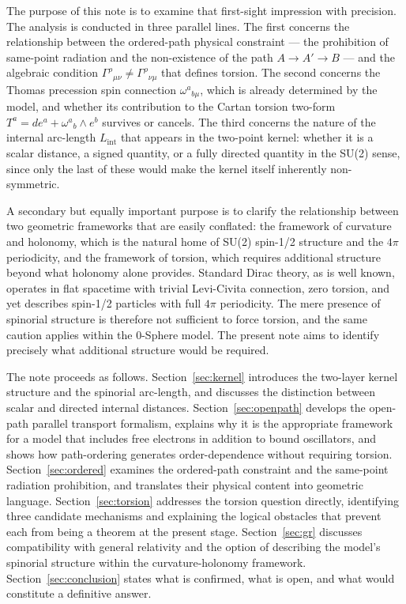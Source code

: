 \documentclass[%
 reprint,
 amsmath,amssymb,
 aps,
 prb,
]{revtex4-2}
\numberwithin{equation}{section}
\newcommand{\Lint}{L_{\text{int}}}
\begin{document}
The purpose of this note is to examine that first-sight impression with precision. The analysis is conducted in three parallel lines. The first concerns the relationship between the ordered-path physical constraint --- the prohibition of same-point radiation and the non-existence of the path $A\to A'\to B$ --- and the algebraic condition $\Gamma^\rho{}_{\mu\nu} \neq \Gamma^\rho{}_{\nu\mu}$ that defines torsion. The second concerns the Thomas precession spin connection $\omega^a{}_{b\mu}$, which is already determined by the model, and whether its contribution to the Cartan torsion two-form $T^a = de^a + \omega^a{}_b \wedge e^b$ survives or cancels. The third concerns the nature of the internal arc-length $\Lint$ that appears in the two-point kernel: whether it is a scalar distance, a signed quantity, or a fully directed quantity in the SU(2) sense, since only the last of these would make the kernel itself inherently non-symmetric.

A secondary but equally important purpose is to clarify the relationship between two geometric frameworks that are easily conflated: the framework of curvature and holonomy, which is the natural home of SU(2) spin-1/2 structure and the $4\pi$ periodicity, and the framework of torsion, which requires additional structure beyond what holonomy alone provides. Standard Dirac theory, as is well known, operates in flat spacetime with trivial Levi-Civita connection, zero torsion, and yet describes spin-1/2 particles with full $4\pi$ periodicity. The mere presence of spinorial structure is therefore not sufficient to force torsion, and the same caution applies within the 0-Sphere model. The present note aims to identify precisely what additional structure would be required.

The note proceeds as follows. Section~\ref{sec:kernel} introduces the two-layer kernel structure and the spinorial arc-length, and discusses the distinction between scalar and directed internal distances. Section~\ref{sec:openpath} develops the open-path parallel transport formalism, explains why it is the appropriate framework for a model that includes free electrons in addition to bound oscillators, and shows how path-ordering generates order-dependence without requiring torsion. Section~\ref{sec:ordered} examines the ordered-path constraint and the same-point radiation prohibition, and translates their physical content into geometric language. Section~\ref{sec:torsion} addresses the torsion question directly, identifying three candidate mechanisms and explaining the logical obstacles that prevent each from being a theorem at the present stage. Section~\ref{sec:gr} discusses compatibility with general relativity and the option of describing the model's spinorial structure within the curvature-holonomy framework. Section~\ref{sec:conclusion} states what is confirmed, what is open, and what would constitute a definitive answer.
\end{document}
